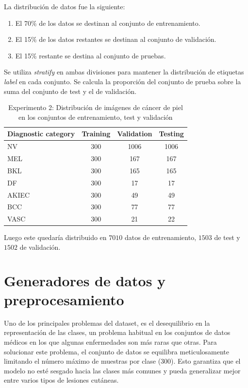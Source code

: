 La distribución de datos fue la siguiente:

   \begin{enumerate}
      \item El 70\% de los datos se destinan al conjunto de entrenamiento.
      \item El 15\% de los datos restantes se destinan al conjunto de validación.
      \item El 15\% restante se destina al conjunto de pruebas.
   \end{enumerate}
   
Se utiliza \textit{stratify} en ambas divisiones para mantener la distribución de etiquetas \textit{label} en cada conjunto. Se calcula la proporción del conjunto de prueba sobre la suma del conjunto de test y el de validación.

   \begin{table}[ht]
      \centering
      \begin{tabular}{lccc}
      \hline
      \textbf{Diagnostic category} & \textbf{Training} & \textbf{Validation} & \textbf{Testing} \\
      \hline
      NV    & 300 & 1006 & 1006 \\
      MEL   & 300 & 167  & 167  \\
      BKL   & 300 & 165  & 165  \\
      DF    & 300 & 17   & 17   \\
      AKIEC & 300 & 49   & 49   \\
      BCC   & 300 & 77   & 77   \\
      VASC  & 300 & 21   & 22   \\
      \hline
      \end{tabular}
      \caption{Experimento 2: Distribución de imágenes de cáncer de piel en los conjuntos de entrenamiento, test y validación}
      \label{tab:train_test_validate_e2}
      \end{table}
      

Luego este quedaría distribuido en $7010$ datos de entrenamiento, $1503$ de test y $1502$ de validación.

\section{Generadores de datos y preprocesamiento}

Uno de los principales problemas del dataset, es el desequilibrio en la representación de las clases, un problema habitual en los conjuntos de datos médicos en los que algunas enfermedades son más raras que otras. Para solucionar este problema, el conjunto de datos se equilibra meticulosamente limitando el número máximo de muestras por clase ($300$). Esto garantiza que el modelo no esté sesgado hacia las clases más comunes y pueda generalizar mejor entre varios tipos de lesiones cutáneas.

